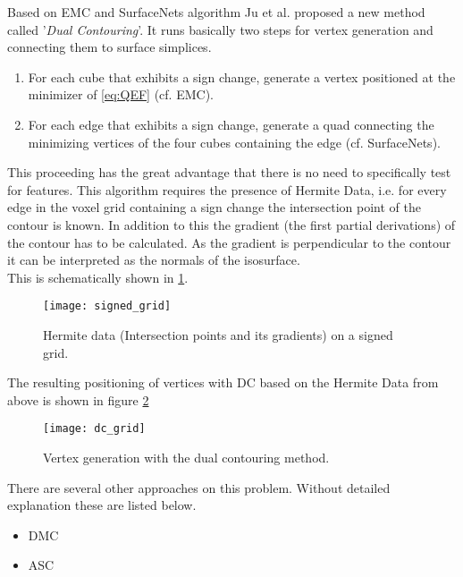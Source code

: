 Based on \ac{EMC} and SurfaceNets algorithm Ju et al. \cite{Ju02} proposed a new method called '\emph{Dual Contouring}'.
It runs basically two steps for vertex generation and connecting them to surface simplices.

\begin{enumerate}
	\item For each cube that exhibits a sign change, generate a vertex positioned at the minimizer of 		\cref{eq:QEF} (cf. \ac{EMC}).
	\item For each edge that exhibits a sign change, generate a quad connecting the minimizing 				vertices of the four cubes containing the edge (cf. SurfaceNets).
\end{enumerate}

This proceeding has the great advantage that there is no need to specifically test for features. This algorithm requires the presence of Hermite Data, i.e. for every edge in the voxel grid containing a sign change the intersection point of the contour is known. In addition to this the gradient (the first partial derivations) of the contour has to be calculated. As the gradient is perpendicular to the contour it can be interpreted as the normals of the isosurface.\\

This is schematically shown in \cref{fig:signed_grid}.

\begin{figure}[H]
	\centering
	\texttt{[image: signed\_grid]}
	\caption{Hermite data (Intersection points and its gradients) on a signed grid. \label{fig:signed_grid}}
\end{figure} 

The resulting positioning of vertices with \ac{DC} based on the Hermite Data from above is shown in figure \cref{fig:dc_grid}

\begin{figure}[H]
	\centering
	\texttt{[image: dc\_grid]}
	\caption{Vertex generation with the dual contouring method. \label{fig:dc_grid}}
\end{figure} 

There are several other approaches on this problem. Without detailed explanation these are listed below.
\begin{itemize}
	\item \ac{DMC} \cite{Sch04}
	\item \ac{ASC} \cite{Pos98}
\end{itemize}



